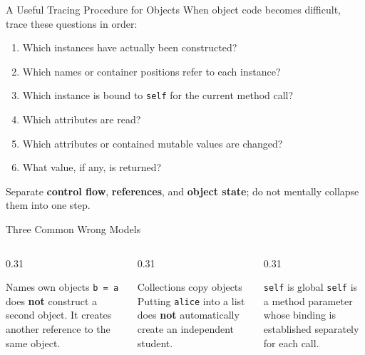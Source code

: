 \documentclass[aspectratio=169,10pt]{beamer}
\begin{document}
\begin{frame}{A Useful Tracing Procedure for Objects}
  When object code becomes difficult, trace these questions in order:

  \begin{enumerate}
    \item Which instances have actually been constructed?
    \item Which names or container positions refer to each instance?
    \item Which instance is bound to \texttt{self} for the current method call?
    \item Which attributes are read?
    \item Which attributes or contained mutable values are changed?
    \item What value, if any, is returned?
  \end{enumerate}

  \begin{keyidea}
    Separate \textbf{control flow}, \textbf{references}, and \textbf{object state}; do not mentally collapse them into one step.
  \end{keyidea}
\end{frame}

\begin{frame}{Three Common Wrong Models}
  \begin{columns}[T,onlytextwidth]
    \begin{column}{0.31\textwidth}
      \begin{alertblock}{Names own objects}
        \texttt{b = a} does \textbf{not} construct a second object. It creates another reference to the same object.
      \end{alertblock}
    \end{column}
    \begin{column}{0.31\textwidth}
      \begin{alertblock}{Collections copy objects}
        Putting \texttt{alice} into a list does \textbf{not} automatically create an independent student.
      \end{alertblock}
    \end{column}
    \begin{column}{0.31\textwidth}
      \begin{alertblock}{\texttt{self} is global}
        \texttt{self} is a method parameter whose binding is established separately for each call.
      \end{alertblock}
    \end{column}
  \end{columns}
\end{frame}
\end{document}

